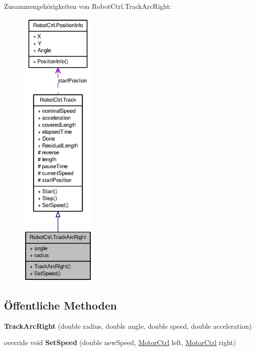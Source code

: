 Zusammengehörigkeiten von RobotCtrl.TrackArcRight:\nopagebreak
\begin{figure}[H]
\begin{center}
\leavevmode
\includegraphics[height=400pt]{class_robot_ctrl_1_1_track_arc_right__coll__graph}
\end{center}
\end{figure}
\subsection*{Öffentliche Methoden}
\begin{DoxyCompactItemize}
\item 
\hypertarget{class_robot_ctrl_1_1_track_arc_right_a54609ff71d77c37e9423cae42de7c347}{
{\bfseries TrackArcRight} (double radius, double angle, double speed, double acceleration)}
\label{class_robot_ctrl_1_1_track_arc_right_a54609ff71d77c37e9423cae42de7c347}

\item 
\hypertarget{class_robot_ctrl_1_1_track_arc_right_a7b2db0d3709e4919da0645a6713a87bb}{
override void {\bfseries SetSpeed} (double newSpeed, \hyperlink{class_robot_ctrl_1_1_motor_ctrl}{MotorCtrl} left, \hyperlink{class_robot_ctrl_1_1_motor_ctrl}{MotorCtrl} right)}
\label{class_robot_ctrl_1_1_track_arc_right_a7b2db0d3709e4919da0645a6713a87bb}

\end{DoxyCompactItemize}

